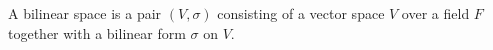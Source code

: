 A bilinear space is a pair $(V, \sigma)$ consisting of a vector space $V$ over a field $F$ together with a bilinear form $\sigma$ on $V$.

